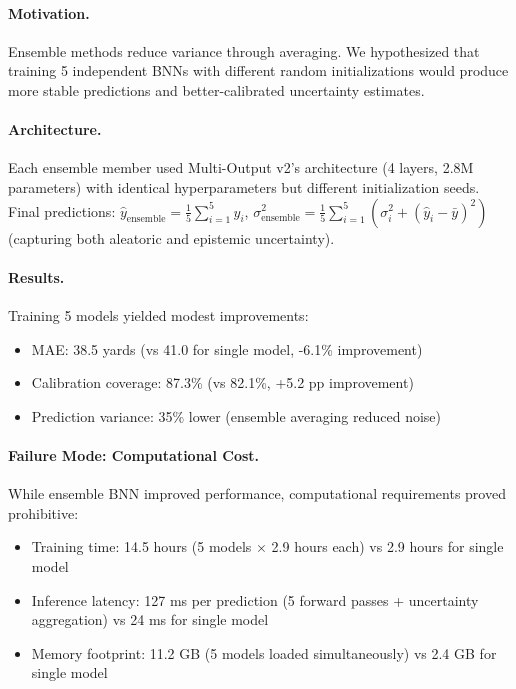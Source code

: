 \paragraph{Motivation.}
Ensemble methods reduce variance through averaging. We hypothesized that training 5 independent BNNs with different random initializations would produce more stable predictions and better-calibrated uncertainty estimates.

\paragraph{Architecture.}
Each ensemble member used Multi-Output v2's architecture (4 layers, 2.8M parameters) with identical hyperparameters but different initialization seeds. Final predictions: $\hat{y}_{\text{ensemble}} = \frac{1}{5} \sum_{i=1}^5 \hat{y}_i$, $\sigma^2_{\text{ensemble}} = \frac{1}{5} \sum_{i=1}^5 (\sigma^2_i + (\hat{y}_i - \bar{y})^2)$ (capturing both aleatoric and epistemic uncertainty).

\paragraph{Results.}
Training 5 models yielded modest improvements:
\begin{itemize}[itemsep=2pt,parsep=0pt]
    \item MAE: 38.5 yards (vs 41.0 for single model, -6.1\% improvement)
    \item Calibration coverage: 87.3\% (vs 82.1\%, +5.2 pp improvement)
    \item Prediction variance: 35\% lower (ensemble averaging reduced noise)
\end{itemize}

\paragraph{Failure Mode: Computational Cost.}
While ensemble BNN improved performance, computational requirements proved prohibitive:
\begin{itemize}[itemsep=2pt,parsep=0pt]
    \item Training time: 14.5 hours (5 models $\times$ 2.9 hours each) vs 2.9 hours for single model
    \item Inference latency: 127 ms per prediction (5 forward passes + uncertainty aggregation) vs 24 ms for single model
    \item Memory footprint: 11.2 GB (5 models loaded simultaneously) vs 2.4 GB for single model
\end{itemize}

